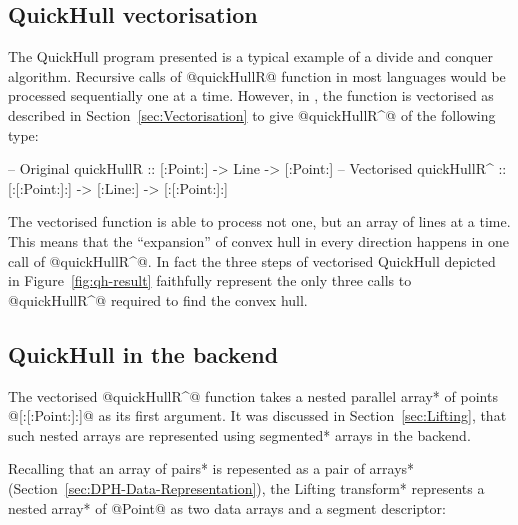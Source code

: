 \documentclass[preamble.tex]{subfiles}
\begin{document}
\subsection{QuickHull vectorisation}

The QuickHull program presented is a typical example of a divide and conquer algorithm. Recursive calls of @quickHullR@ function in most languages would be processed sequentially one at a time. However, in \DPH, the function is vectorised as described in Section~\ref{sec:Vectorisation} to give @quickHullR^@ of the following type:


\begin{hscode}[literate={^}{{$^\uparrow$}}1,]
-- Original
quickHullR  :: [:Point:] -> Line -> [:Point:]
-- Vectorised
quickHullR^ :: [:[:Point:]:] -> [:Line:] -> [:[:Point:]:]
\end{hscode}


The vectorised function is able to process not one, but an array of lines at a time. This means that the ``expansion'' of convex hull in every direction happens in one call of @quickHullR^@. In fact the three steps of vectorised QuickHull depicted in Figure~\ref{fig:qh-result} faithfully represent the only three calls to @quickHullR^@ required to find the convex hull.



\subsection{QuickHull in the backend}

The vectorised @quickHullR^@ function takes a \*nested parallel array* of points @[:[:Point:]:]@ as its first argument. It was discussed in Section~\ref{sec:Lifting}, that such nested arrays are represented using \*segmented* arrays in the backend.

Recalling that an \*array of pairs* is repesented as a \*pair of arrays* (Section~\ref{sec:DPH-Data-Representation}), the \*Lifting transform* represents a \*nested array* of @Point@ as two data arrays and a segment descriptor:

\newlength\fixedcharwidth
{}
\newcommand\seg[1]{\rule{#1\fixedcharwidth}{1pt}}

\end{document}
